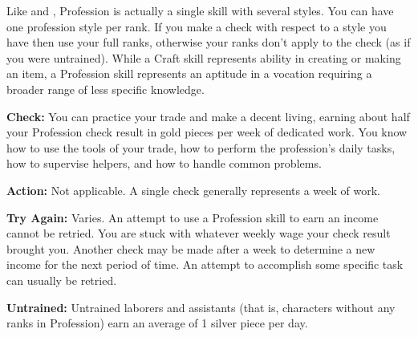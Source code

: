 
Like  and , Profession is actually a single skill with several styles. You can have one profession style per rank. If you make a check with respect to a style you have then use your full ranks, otherwise your ranks don't apply to the check (as if you were untrained). While a Craft skill represents ability in creating or making an item, a Profession skill represents an aptitude in a vocation requiring a broader range of less specific knowledge.

\textbf{Check:} You can practice your trade and make a decent living, earning about half your Profession check result in gold pieces per week of dedicated work. You know how to use the tools of your trade, how to perform the profession's daily tasks, how to supervise helpers, and how to handle common problems.

\textbf{Action:} Not applicable. A single check generally represents a week of work.

\textbf{Try Again:} Varies. An attempt to use a Profession skill to earn an income cannot be retried. You are stuck with whatever weekly wage your check result brought you. Another check may be made after a week to determine a new income for the next period of time. An attempt to accomplish some specific task can usually be retried.

\textbf{Untrained:} Untrained laborers and assistants (that is, characters without any ranks in Profession) earn an average of 1 silver piece per day.

